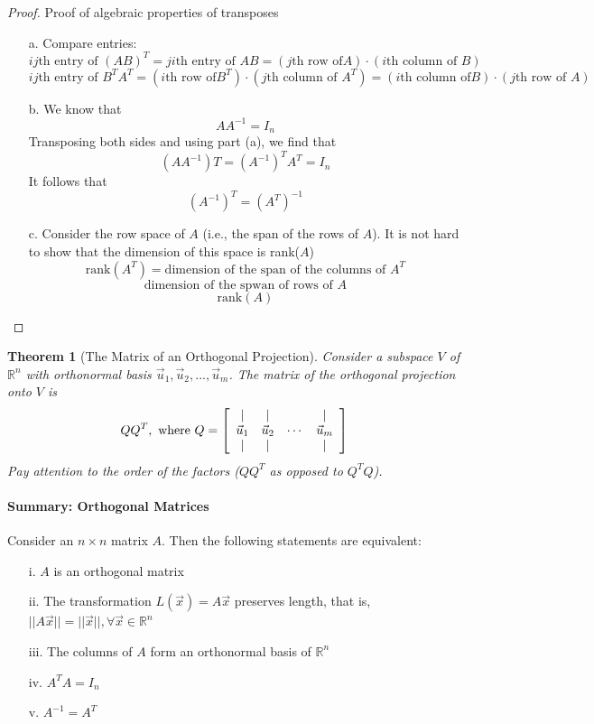 \documentclass[10pt]{report}
\newtheorem{thm2}{Theorem}[section]
\begin{document}
\begin{proof}
Proof of algebraic properties of transposes
\begin{itemize}
\item[a.] Compare entries:
$$ij\text{th entry of }(AB)^T = ji\text{th entry of }AB = (j\text{th row of} A) \cdot (i\text{th column of }B)$$
$$ij\text{th entry of }B^TA^T = (i\text{th row of} B^T) \cdot (j\text{th column of }A^T) = (i\text{th column of} B) \cdot (j\text{th row of }A)$$
\item[b.] We know that
$$AA^{-1}=I_n$$
Transposing both sides and using part (a), we find that
$$(AA^{-1})T = (A^{-1})^TA^T = I_n$$
It follows that 
$$(A^{-1})^T = (A^T)^{-1}$$
\item[c.] Consider the row space of $A$ (i.e., the span of the rows of $A$). It is not hard to show that the dimension of this space is rank($A$)
$$\text{rank}(A^T)=\text{dimension of the span of the columns of }A^T$$
$$\text{dimension of the spwan of rows of }A$$
$$\text{rank}(A)$$
\end{itemize}
\end{proof}
\begin{thm2}[The Matrix of an Orthogonal Projection]
Consider a subspace $V$ of $\mathbb{R}^n$ with orthonormal basis $\vec{u}_1, \vec{u}_2, ..., \vec{u}_m$. The matrix of the orthogonal projection onto $V$ is
$$QQ^T, \text{ where } Q = \left[ \begin{array}{c c c c}
| & | & & |\\
\vec{u}_1 & \vec{u}_2 & \cdots & \vec{u}_m\\
| & | & & |
\end{array}\right]$$
Pay attention to the order of the factors ($QQ^T$ as opposed to $Q^TQ$).
\end{thm2}
\paragraph{Summary: Orthogonal Matrices}
Consider an $n\times n$ matrix $A$. Then the following statements are equivalent:
\begin{itemize}
\item[i.] $A$ is an orthogonal matrix
\item[ii.] The transformation $L(\vec{x}) = A\vec{x}$ preserves length, that is, $||A\vec{x}||=||\vec{x}||,\forall \vec{x}\in \mathbb{R}^n$
\item[iii.] The columns of $A$ form an orthonormal basis of $\mathbb{R}^n$
\item[iv.] $A^TA=I_n$
\item[v.] $A^{-1}=A^T$
\end{itemize}
\end{document}
